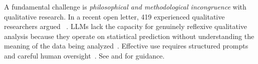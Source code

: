 A fundamental challenge is \emph{philosophical and methodological incongruence} with qualitative research. In a recent open letter, 419 experienced qualitative researchers argued ~\cite{jowsey2025reject}. LLMs lack the capacity for genuinely reflexive qualitative analysis because they operate on statistical prediction without understanding the meaning of the data being analyzed~\cite{DBLP:journals/corr/abs-2306-13298, DBLP:journals/corr/abs-2510-18456}. Effective use requires structured prompts and careful human oversight~\cite{DBLP:conf/wsese/BarrosANKKNB25}. See \humanvalidation and \limitationsmitigations for guidance.

